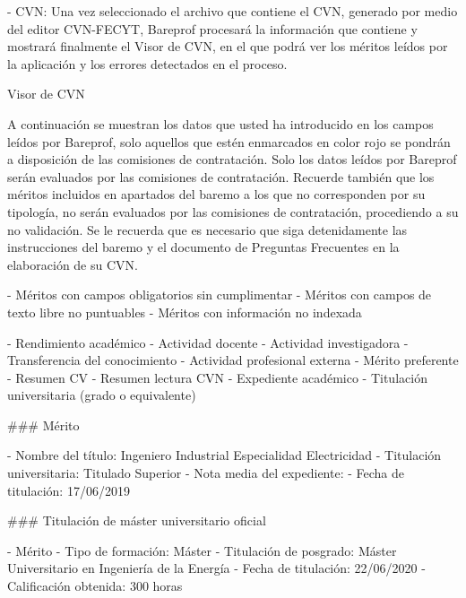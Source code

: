 \documentclass{article}
\begin{document}
\begin{itemize}
\begin{itemize}
\begin{scriptsize}
                  - CVN: Una vez seleccionado el archivo que contiene el CVN, generado por medio del editor CVN-FECYT, Bareprof procesará la información que contiene y mostrará finalmente el Visor de CVN, en el que podrá ver los méritos leídos por la aplicación y los errores detectados en el proceso.

                  Visor de CVN

                  A continuación se muestran los datos que usted ha introducido en los campos leídos por Bareprof, solo aquellos que estén enmarcados en color rojo se pondrán a disposición de las comisiones de contratación. Solo los datos leídos por Bareprof serán evaluados por las comisiones de contratación. Recuerde también que los méritos incluidos en apartados del baremo a los que no corresponden por su tipología, no serán evaluados por las comisiones de contratación, procediendo a su no validación. Se le recuerda que es necesario que siga detenidamente las instrucciones del baremo y el documento de Preguntas Frecuentes en la elaboración de su CVN.

                  - Méritos con campos obligatorios sin cumplimentar
                  - Méritos con campos de texto libre no puntuables
                  - Méritos con información no indexada

                  - Rendimiento académico
                  - Actividad docente
                  - Actividad investigadora
                  - Transferencia del conocimiento
                  - Actividad profesional externa
                  - Mérito preferente
                  - Resumen CV
                  - Resumen lectura CVN
                  - Expediente académico
                  - Titulación universitaria (grado o equivalente)

                  \#\#\# Mérito

                  - Nombre del título: Ingeniero Industrial Especialidad Electricidad
                  - Titulación universitaria: Titulado Superior
                  - Nota media del expediente:
                  - Fecha de titulación: 17/06/2019

                  \#\#\# Titulación de máster universitario oficial

                  - Mérito
                  - Tipo de formación: Máster
                  - Titulación de posgrado: Máster Universitario en Ingeniería de la Energía
                  - Fecha de titulación: 22/06/2020
                  - Calificación obtenida: 300 horas


\end{scriptsize}
\end{itemize}
\end{itemize}
\end{document}
